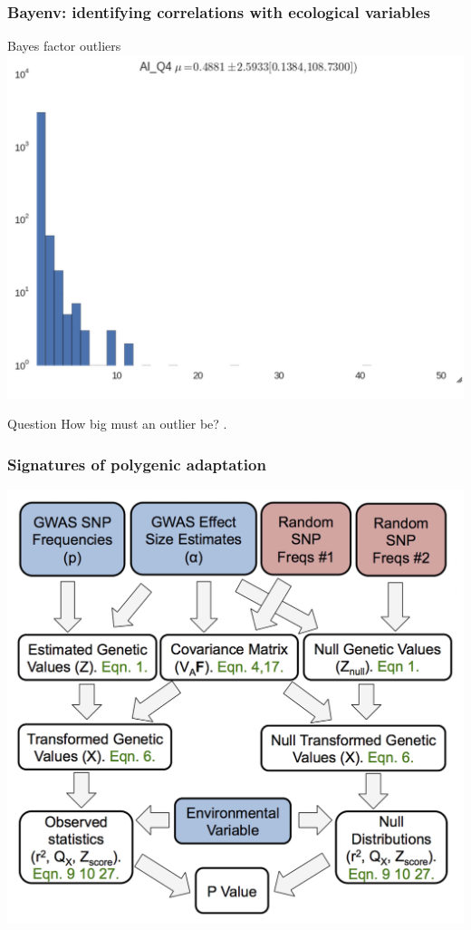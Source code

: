 \begin{frame}
\frametitle{Bayenv: identifying correlations with ecological
variables}
\begin{block}{Bayes factor outliers}
\centering
\includegraphics[height=0.6\textheight]{bayenv_outlier.png}
\end{block}
\begin{block}{Question}
How big must an outlier be? \citep{Kass:1995vb}.
\end{block}
\end{frame}



\begin{frame}
\frametitle{Signatures of polygenic adaptation}
\begin{block}{}
\centering
\includegraphics[height=.8\textheight]{bc1.png}
\end{block}
\tiny
\citet[Figure 1]{Berg:2014bs}
\end{frame}

